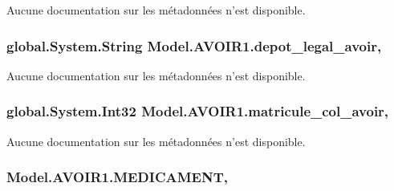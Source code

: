 Aucune documentation sur les métadonnées n'est disponible. 

\hypertarget{class_model_1_1_a_v_o_i_r1_adf026bb26b0d9dbeeb67174ac7e4e6f4}{
\subsubsection[{depot\-\_\-legal\-\_\-avoir}]{\setlength{\rightskip}{0pt plus 5cm}global.\-System.\-String Model.\-A\-V\-O\-I\-R1.\-depot\-\_\-legal\-\_\-avoir\hspace{0.3cm}{\ttfamily [get]}, {\ttfamily [set]}}}\label{class_model_1_1_a_v_o_i_r1_adf026bb26b0d9dbeeb67174ac7e4e6f4}


Aucune documentation sur les métadonnées n'est disponible. 

\hypertarget{class_model_1_1_a_v_o_i_r1_a2a8193976f08870f00198f32d8ae2613}{
\subsubsection[{matricule\-\_\-col\-\_\-avoir}]{\setlength{\rightskip}{0pt plus 5cm}global.\-System.\-Int32 Model.\-A\-V\-O\-I\-R1.\-matricule\-\_\-col\-\_\-avoir\hspace{0.3cm}{\ttfamily [get]}, {\ttfamily [set]}}}\label{class_model_1_1_a_v_o_i_r1_a2a8193976f08870f00198f32d8ae2613}


Aucune documentation sur les métadonnées n'est disponible. 

\hypertarget{class_model_1_1_a_v_o_i_r1_ab96497f0366be59e6527444f5ba21967}{
\subsubsection[{M\-E\-D\-I\-C\-A\-M\-E\-N\-T}]{ Model.\-A\-V\-O\-I\-R1.\-M\-E\-D\-I\-C\-A\-M\-E\-N\-T\hspace{0.3cm}{\ttfamily [get]}, {\ttfamily [set]}}}\label{class_model_1_1_a_v_o_i_r1_ab96497f0366be59e6527444f5ba21967}


